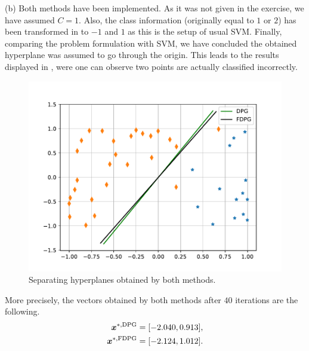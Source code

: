 \indent (b) Both methods have been implemented. As it was not given in the exercise, we have assumed $C=1$. Also, the class information (originally equal to $1$ or $2$) has been transformed in to $-1$ and $1$ as this is the setup of usual SVM. Finally, comparing the problem formulation with SVM, we have concluded the obtained hyperplane was assumed to go through the origin. This leads to the results displayed in , were one can observe two points are actually classified incorrectly. 
\begin{figure}[H]
    \centering
    \includegraphics[width=14cm]{images/part2_ex3.pdf}
    \caption{Separating hyperplanes obtained by both methods.   }
  \label{fig:ex3}
\end{figure}
More precisely, the vectors obtained by both methods after $40$ iterations are the following. 
       \begin{align*}
       \boldsymbol x^{*,\text{DPG}} &= [-2.040, 0.913],\\
        \boldsymbol x^{*,\text{FDPG}} &= [-2.124,1.012].
       \end{align*}


